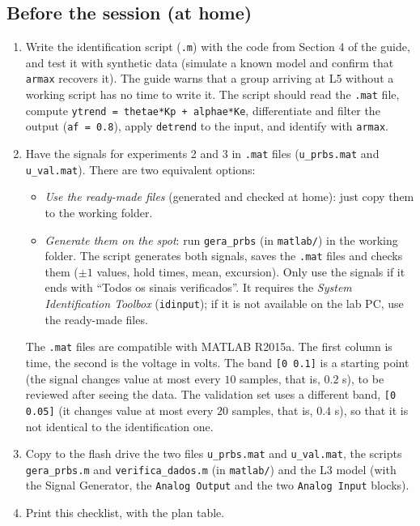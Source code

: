 \documentclass[a4paper,11pt]{article}
\begin{document}
\subsection*{Before the session (at home)}

\begin{enumerate}[label=$\square$, leftmargin=1.5em]
  \item Write the identification script (\texttt{.m}) with the code from Section 4 of the guide, and test it with synthetic data (simulate a known model and confirm that \texttt{armax} recovers it).
  The guide warns that a group arriving at L5 without a working script has no time to write it.
  The script should read the \texttt{.mat} file, compute \texttt{ytrend = thetae*Kp + alphae*Ke}, differentiate and filter the output (\texttt{af = 0.8}), apply \texttt{detrend} to the input, and identify with \texttt{armax}.

  \item Have the signals for experiments 2 and 3 in \texttt{.mat} files (\texttt{u\_prbs.mat} and \texttt{u\_val.mat}).
  There are two equivalent options:
  \begin{itemize}
    \item \emph{Use the ready-made files} (generated and checked at home): just copy them to the working folder.
    \item \emph{Generate them on the spot}: run \texttt{gera\_prbs} (in \texttt{matlab/}) in the working folder.
    The script generates both signals, saves the \texttt{.mat} files and checks them ($\pm 1$ values, hold times, mean, excursion).
    Only use the signals if it ends with ``Todos os sinais verificados''.
    It requires the \emph{System Identification Toolbox} (\texttt{idinput}); if it is not available on the lab PC, use the ready-made files.
  \end{itemize}
  The \texttt{.mat} files are compatible with MATLAB R2015a.
  The first column is time, the second is the voltage in volts.
  The band \texttt{[0 0.1]} is a starting point (the signal changes value at most every $10$ samples, that is, $0.2$ s), to be reviewed after seeing the data.
  The validation set uses a different band, \texttt{[0 0.05]} (it changes value at most every $20$ samples, that is, $0.4$ s), so that it is not identical to the identification one.

  \item Copy to the flash drive the two files \texttt{u\_prbs.mat} and \texttt{u\_val.mat}, the scripts \texttt{gera\_prbs.m} and \texttt{verifica\_dados.m} (in \texttt{matlab/}) and the L3 model (with the Signal Generator, the \texttt{Analog Output} and the two \texttt{Analog Input} blocks).

  \item Print this checklist, with the plan table.
\end{enumerate}
\end{document}
